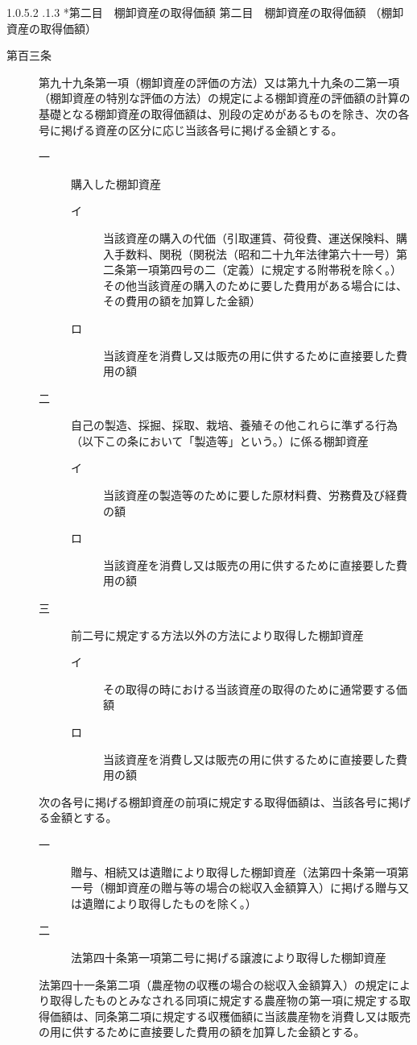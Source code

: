 \documentclass[twocolumn,a4j,10pt]{ltjtarticle}
\makeatletter
\newcommand{\subsubsubsection}{\@startsection{paragraph}{4}{\z@}%
  {1.0\Cvs \@plus.5\Cdp \@minus.2\Cdp}%
  {.1\Cvs \@plus.3\Cdp}%
  {\reset@font\sffamily\normalsize}
}
\makeatother
\begin{document}
\subsubsubsection*{第二目　棚卸資産の取得価額}
{第二目　棚卸資産の取得価額}
\noindent\hspace{10pt}（棚卸資産の取得価額）
\begin{description}
\item[第百三条]第九十九条第一項（棚卸資産の評価の方法）又は第九十九条の二第一項（棚卸資産の特別な評価の方法）の規定による棚卸資産の評価額の計算の基礎となる棚卸資産の取得価額は、別段の定めがあるものを除き、次の各号に掲げる資産の区分に応じ当該各号に掲げる金額とする。
\begin{description}
\item[一]購入した棚卸資産
\begin{description}
\item[イ]当該資産の購入の代価（引取運賃、荷役費、運送保険料、購入手数料、関税（関税法（昭和二十九年法律第六十一号）第二条第一項第四号の二（定義）に規定する附帯税を除く。）その他当該資産の購入のために要した費用がある場合には、その費用の額を加算した金額）
\item[ロ]当該資産を消費し又は販売の用に供するために直接要した費用の額
\end{description}
\item[二]自己の製造、採掘、採取、栽培、養殖その他これらに準ずる行為（以下この条において「製造等」という。）に係る棚卸資産
\begin{description}
\item[イ]当該資産の製造等のために要した原材料費、労務費及び経費の額
\item[ロ]当該資産を消費し又は販売の用に供するために直接要した費用の額
\end{description}
\item[三]前二号に規定する方法以外の方法により取得した棚卸資産
\begin{description}
\item[イ]その取得の時における当該資産の取得のために通常要する価額
\item[ロ]当該資産を消費し又は販売の用に供するために直接要した費用の額
\end{description}
\end{description}
\item[]次の各号に掲げる棚卸資産の前項に規定する取得価額は、当該各号に掲げる金額とする。
\begin{description}
\item[一]贈与、相続又は遺贈により取得した棚卸資産（法第四十条第一項第一号（棚卸資産の贈与等の場合の総収入金額算入）に掲げる贈与又は遺贈により取得したものを除く。）
\item[二]法第四十条第一項第二号に掲げる譲渡により取得した棚卸資産
\end{description}
\item[]法第四十一条第二項（農産物の収穫の場合の総収入金額算入）の規定により取得したものとみなされる同項に規定する農産物の第一項に規定する取得価額は、同条第二項に規定する収穫価額に当該農産物を消費し又は販売の用に供するために直接要した費用の額を加算した金額とする。
\end{description}
\end{document}
